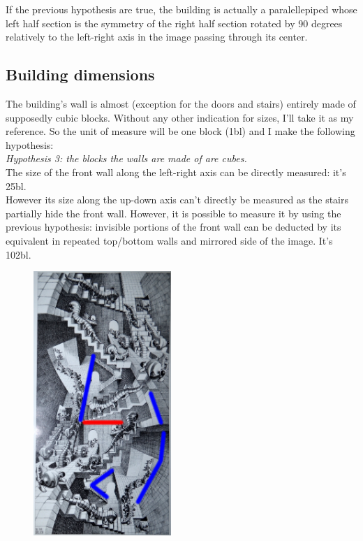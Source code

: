 \documentclass[12pt, a4paper]{article}
\begin{document}
If the previous hypothesis are true, the building is actually a paralellepiped whose left half section is the symmetry of the right half section rotated by 90 degrees relatively to the left-right axis in the image passing through its center.\\

\subsection{Building dimensions}

The building's wall is almost (exception for the doors and stairs) entirely made of supposedly cubic blocks. Without any other indication for sizes, I'll take it as my reference. So the unit of measure will be one block (1bl) and I make the following hypothesis:\\

\emph{Hypothesis 3: the blocks the walls are made of are cubes.}\\

The size of the front wall along the left-right axis can be directly measured: it's 25bl.\\

However its size along the up-down axis can't directly be measured as the stairs partially hide the front wall. However, it is possible to measure it by using the previous hypothesis: invisible portions of the front wall can be deducted by its equivalent in repeated top/bottom walls and mirrored side of the image. It's 102bl.\\

\begin{center}
\begin{figure}[H]
\centering\includegraphics[height=10cm]{./dimension.png}\\
\end{figure}
\end{center}
\end{document}
